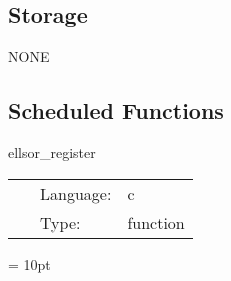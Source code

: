 \documentclass{article}
\begin{document}
\subsection*{Storage}NONE
\subsection*{Scheduled Functions}
\vspace{5mm}


\hspace{5mm} ellsor\_register 

\hspace{5mm}{\it register the sor solvers } 


\hspace{5mm}

 \begin{tabular*}{160mm}{cll} 
~ & Language:  & c \\ 
~ & Type:  & function \\ 
\end{tabular*} 



\vspace{5mm}\parskip = 10pt 
\end{document}

